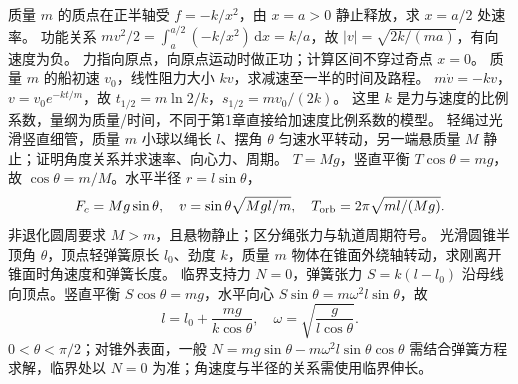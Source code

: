 \problemtext 质量 $m$ 的质点在正半轴受 $f=-k/x^2$，由 $x=a>0$ 静止释放，求 $x=a/2$ 处速率。
\workings 功能关系 $mv^2/2=\int_a^{a/2}(-k/x^2)\,\mathrm dx=k/a$，故 $|v|=\sqrt{2k/(ma)}$，有向速度为负。
\crosscheck 力指向原点，向原点运动时做正功；计算区间不穿过奇点 $x=0$。
\problemtext 质量 $m$ 的船初速 $v_0$，线性阻力大小 $kv$，求减速至一半的时间及路程。
\workings $m\dot v=-kv$，$v=v_0e^{-kt/m}$，故 $t_{1/2}=m\ln2/k$，$s_{1/2}=mv_0/(2k)$。
\crosscheck 这里 $k$ 是力与速度的比例系数，量纲为质量/时间，不同于第1章直接给加速度比例系数的模型。
\problemtext 轻绳过光滑竖直细管，质量 $m$ 小球以绳长 $l$、摆角 $\theta$ 匀速水平转动，另一端悬质量 $M$ 静止；证明角度关系并求速率、向心力、周期。
\workings $T=Mg$，竖直平衡 $T\cos\theta=mg$，故 $\cos\theta=m/M$。水平半径 $r=l\sin\theta$，
\[
F_c=Mg\sin\theta,\quad v=\sin\theta\sqrt{Mgl/m},\quad T_{\rm orb}=2\pi\sqrt{ml/(Mg)}.
\]
\crosscheck 非退化圆周要求 $M>m$，且悬物静止；区分绳张力与轨道周期符号。
\problemtext 光滑圆锥半顶角 $\theta$，顶点轻弹簧原长 $l_0$、劲度 $k$，质量 $m$ 物体在锥面外绕轴转动，求刚离开锥面时角速度和弹簧长度。
\workings 临界支持力 $N=0$，弹簧张力 $S=k(l-l_0)$ 沿母线向顶点。竖直平衡 $S\cos\theta=mg$，水平向心 $S\sin\theta=m\omega^2l\sin\theta$，故
\[
l=l_0+\frac{mg}{k\cos\theta},\quad
\omega=\sqrt{\frac{g}{l\cos\theta}}.
\]
\crosscheck $0<\theta<\pi/2$；对锥外表面，一般 $N=mg\sin\theta-m\omega^2l\sin\theta\cos\theta$ 需结合弹簧方程求解，临界处以 $N=0$ 为准；角速度与半径的关系需使用临界伸长。

